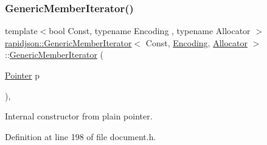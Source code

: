 \begin{DoxyCode}{0}

\end{DoxyCode}
\mbox{\label{classrapidjson_1_1_generic_member_iterator_a5defd2655cc9878bbc9431d0c2d1b2e0}} 
\subsubsection{\texorpdfstring{GenericMemberIterator()}{GenericMemberIterator()}\hspace{0.1cm}{\footnotesize\ttfamily [3/3]}}
{\footnotesize\ttfamily template$<$bool Const, typename Encoding , typename Allocator $>$ \\
\mbox{\hyperlink{classrapidjson_1_1_generic_member_iterator}{rapidjson\+::\+Generic\+Member\+Iterator}}$<$ Const, \mbox{\hyperlink{classrapidjson_1_1_encoding}{Encoding}}, \mbox{\hyperlink{classrapidjson_1_1_allocator}{Allocator}} $>$\+::\mbox{\hyperlink{classrapidjson_1_1_generic_member_iterator}{Generic\+Member\+Iterator}} (\begin{DoxyParamCaption}\item[{\mbox{\hyperlink{classrapidjson_1_1_generic_member_iterator_aa9d53504374c7c6bdf46775482c5b107}{Pointer}}}]{p }\end{DoxyParamCaption})\hspace{0.3cm}{\ttfamily [explicit]}, {\ttfamily [private]}}



Internal constructor from plain pointer. 



Definition at line 198 of file document.\+h.


\begin{DoxyCode}{0}

\end{DoxyCode}


